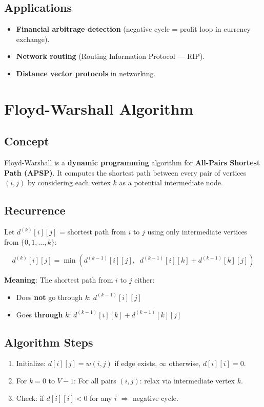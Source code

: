 \documentclass[12pt,a4paper]{article}
\begin{document}
\subsection{Applications}
\begin{itemize}
    \item \textbf{Financial arbitrage detection} (negative cycle = profit loop in currency exchange).
    \item \textbf{Network routing} (Routing Information Protocol — RIP).
    \item \textbf{Distance vector protocols} in networking.
\end{itemize}

\newpage

\section{Floyd-Warshall Algorithm}

\subsection{Concept}
Floyd-Warshall is a \textbf{dynamic programming} algorithm for \textbf{All-Pairs Shortest Path (APSP)}. It computes the shortest path between every pair of vertices $(i, j)$ by considering each vertex $k$ as a potential intermediate node.

\subsection{Recurrence}
Let $d^{(k)}[i][j]$ = shortest path from $i$ to $j$ using only intermediate vertices from $\{0, 1, \ldots, k\}$:

\[
d^{(k)}[i][j] = \min\!\left(d^{(k-1)}[i][j],\;\; d^{(k-1)}[i][k] + d^{(k-1)}[k][j]\right)
\]

\textbf{Meaning}: The shortest path from $i$ to $j$ either:
\begin{itemize}
    \item Does \textbf{not} go through $k$: $d^{(k-1)}[i][j]$
    \item Goes \textbf{through} $k$: $d^{(k-1)}[i][k] + d^{(k-1)}[k][j]$
\end{itemize}

\subsection{Algorithm Steps}
\begin{enumerate}
    \item Initialize: $d[i][j] = w(i,j)$ if edge exists, $\infty$ otherwise, $d[i][i] = 0$.
    \item For $k = 0$ to $V-1$:
          \quad For all pairs $(i,j)$: relax via intermediate vertex $k$.
    \item Check: if $d[i][i] < 0$ for any $i$ $\Rightarrow$ negative cycle.
\end{enumerate}
\end{document}
